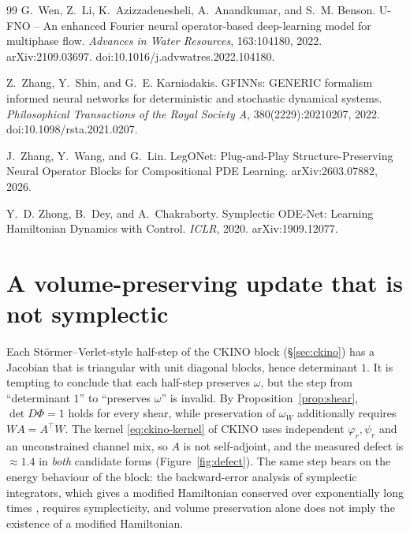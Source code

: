 \documentclass[11pt]{article}
\theoremstyle{definition}
\theoremstyle{remark}
\newcommand{\ckino}{\textsc{CKINO}}
\begin{document}
\begin{thebibliography}{99}
G.~Wen, Z.~Li, K.~Azizzadenesheli, A.~Anandkumar, and S.~M. Benson.
\newblock U-FNO -- An enhanced Fourier neural operator-based deep-learning model
for multiphase flow.
\newblock \emph{Advances in Water Resources}, 163:104180, 2022.
arXiv:2109.03697. doi:10.1016/j.advwatres.2022.104180.

Z.~Zhang, Y.~Shin, and G.~E. Karniadakis.
\newblock GFINNs: GENERIC formalism informed neural networks for deterministic
and stochastic dynamical systems.
\newblock \emph{Philosophical Transactions of the Royal Society A},
380(2229):20210207, 2022. doi:10.1098/rsta.2021.0207.

J.~Zhang, Y.~Wang, and G.~Lin.
\newblock LegONet: Plug-and-Play Structure-Preserving Neural Operator Blocks for
Compositional PDE Learning.
\newblock arXiv:2603.07882, 2026.

Y.~D. Zhong, B.~Dey, and A.~Chakraborty.
\newblock Symplectic ODE-Net: Learning Hamiltonian Dynamics with Control.
\newblock \emph{ICLR}, 2020. arXiv:1909.12077.

\end{thebibliography}

\appendix
\section{A volume-preserving update that is not symplectic}
\label{app:volume}

Each St\"ormer--Verlet-style half-step of the \ckino{} block (\S\ref{sec:ckino})
has a Jacobian that is triangular with unit diagonal blocks, hence determinant
$1$. It is tempting to conclude that each half-step preserves $\omega$, but the
step from ``determinant $1$'' to ``preserves $\omega$'' is invalid. By
Proposition~\ref{prop:shear}, $\det D\Phi=1$ holds for every shear, while
preservation of $\omega_W$ additionally requires $WA=A^{\top}W$. The kernel
\eqref{eq:ckino-kernel} of \ckino{} uses independent $\varphi_r,\psi_r$ and an
unconstrained channel mix, so $A$ is not self-adjoint, and the measured defect is
$\approx1.4$ in \emph{both} candidate forms (Figure~\ref{fig:defect}). The same
step bears on the energy behaviour of the block: the backward-error analysis of
symplectic integrators, which gives a modified Hamiltonian conserved over
exponentially long times \citep{hairer2006gni}, requires symplecticity, and volume
preservation alone does not imply the existence of a modified Hamiltonian.
\end{document}
